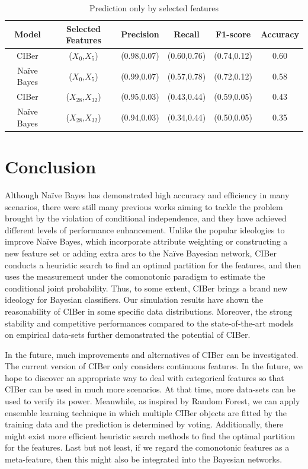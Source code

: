\documentclass[twoside,11pt]{article}
\begin{document}
\begin{table}
\centering
 \begin{tabular}{||c c c c c c||}
 \hline
 Model & Selected Features & Precision & Recall & F1-score & Accuracy\\ [0.5ex] 
 \hline\hline
 CIBer & ($X_{0}$,$X_{5}$) & (0.98,0.07) & (0.60,0.76) & (0.74,0.12) & 0.60 \\ 
 \hline
 Na\"ive Bayes & ($X_{0}$,$X_{5}$) & (0.99,0.07) & (0.57,0.78) & (0.72,0.12) & 0.58 \\
 \hline
 CIBer & ($X_{28}$,$X_{32}$) & (0.95,0.03) & (0.43,0.44) & (0.59,0.05) & 0.43 \\ 
 \hline
 Na\"ive Bayes & ($X_{28}$,$X_{32}$) & (0.94,0.03) & (0.34,0.44) & (0.50,0.05) & 0.35 \\
 \hline
 \end{tabular}
\caption{Prediction only by selected features}
\label{selected_features}
\end{table}

\section{Conclusion}\label{conclusion}
Although Na\"ive Bayes has demonstrated high accuracy and efficiency in many scenarios, there were still many previous works aiming to tackle the problem brought by the violation of conditional independence, and they have achieved different levels of performance enhancement. Unlike the popular ideologies to improve Na\"ive Bayes, which incorporate attribute weighting or constructing a new feature set or adding extra arcs to the Na\"ive Bayesian network, CIBer conducts a heuristic search to find an optimal partition for the features, and then uses the measurement under the comonotonic paradigm to estimate the conditional joint probability. Thus, to some extent, CIBer brings a brand new ideology for Bayesian classifiers. Our simulation results have shown the reasonability of CIBer in some specific data distributions. Moreover, the strong stability and competitive performances compared to the state-of-the-art models on empirical data-sets further demonstrated the potential of CIBer. 

In the future, much improvements and alternatives of CIBer can be investigated. The current version of CIBer only considers continuous features. In the future, we hope to discover an appropriate way to deal with categorical features so that CIBer can be used in much more scenarios. At that time, more data-sets can be used to verify its power. Meanwhile, as inspired by Random Forest, we can apply ensemble learning technique in which multiple CIBer objects are fitted by the training data and the prediction is determined by voting. Additionally, there might exist more efficient heuristic search methods to find the optimal partition for the features. Last but not least, if we regard the comonotonic features as a meta-feature, then this might also be integrated into the Bayesian networks.



\end{document}
